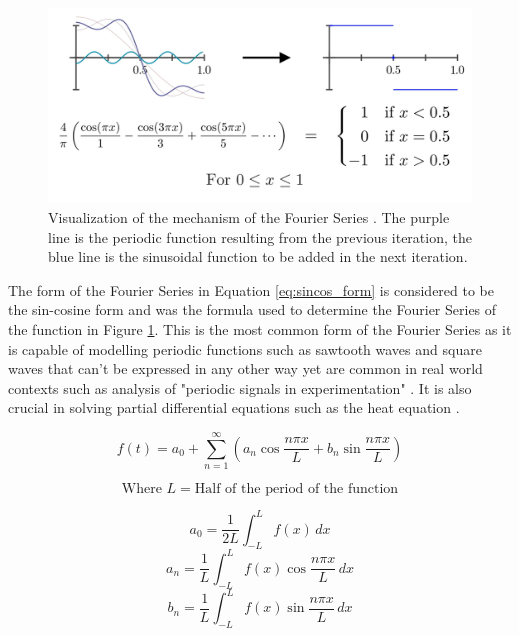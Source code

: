 \documentclass[letterpaper, 12pt]{article}
\begin{document}
\begin{figure}[H]
    \centering
    \includegraphics[width=.8\textwidth]{fourier_basic_visual.png}
    \caption{Visualization of the mechanism of the Fourier Series \protect\cite{sandersonWhatFourierSeries2019}. The purple line is the periodic function resulting from the previous iteration, the blue line is the sinusoidal function to be added in the next iteration.}
    \label{fig:fourier_visual}
\end{figure}

The form of the Fourier Series in Equation \ref*{eq:sincos_form} is considered
to be the sin-cosine form and was the formula used to determine
the Fourier Series of the function in Figure \ref*{fig:fourier_visual}.
This is the most common form of the Fourier Series
as it is capable of modelling periodic functions such as
sawtooth waves and square waves that can't be expressed
in any other way yet are common in real world contexts such as analysis of "periodic signals in experimentation" \cite{FourierSeriesDefinition}.
It is also crucial in solving partial differential equations
such as the heat equation \cite{sandersonWhatFourierSeries2019}.

\begin{equation}
    \label{eq:sincos_form}
    f(t) = a_0 + \sum_{n=1}^{\infty} (a_n \cos \frac{n\pi x}{L} + b_n \sin \frac{n\pi x}{L})
\end{equation}

\[
    \text{Where } L = \text{Half of the period of the function}
\]

\begin{equation}
    \label{eq:a_not}
    a_0 = \frac{1}{2L} \int_{-L}^{L} f(x) \,dx
\end{equation}
\begin{equation}
    \label{eq:a_n}
    a_n = \frac{1}{L} \int_{-L}^{L} f(x) \cos \frac{n\pi x}{L} \,dx
\end{equation}
\begin{equation}
    \label{eq:b_n}
    b_n = \frac{1}{L} \int_{-L}^{L} f(x) \sin \frac{n\pi x}{L} \,dx
\end{equation}
\end{document}
